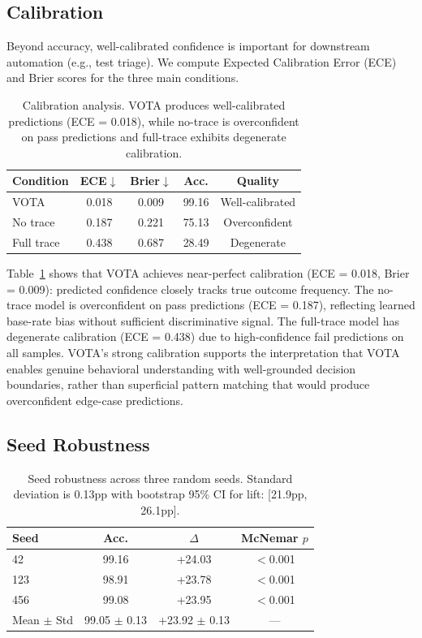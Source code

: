 \documentclass[11pt,a4paper]{article}
\begin{document}
\subsection{Calibration}

Beyond accuracy, well-calibrated confidence is important for downstream automation (e.g., test triage). We compute Expected Calibration Error (ECE) and Brier scores for the three main conditions.

\begin{table}[t]
\centering
\small
\begin{tabular}{lcccc}
\toprule
\textbf{Condition} & \textbf{ECE}$\downarrow$ & \textbf{Brier}$\downarrow$ & \textbf{Acc.} & \textbf{Quality} \\
\midrule
VOTA & 0.018 & 0.009 & 99.16 & Well-calibrated \\
No trace & 0.187 & 0.221 & 75.13 & Overconfident \\
Full trace & 0.438 & 0.687 & 28.49 & Degenerate \\
\bottomrule
\end{tabular}
\caption{Calibration analysis. VOTA produces well-calibrated predictions (ECE = 0.018), while no-trace is overconfident on pass predictions and full-trace exhibits degenerate calibration.}
\label{tab:calibration}
\end{table}

Table~\ref{tab:calibration} shows that VOTA achieves near-perfect calibration (ECE = 0.018, Brier = 0.009): predicted confidence closely tracks true outcome frequency. The no-trace model is overconfident on pass predictions (ECE = 0.187), reflecting learned base-rate bias without sufficient discriminative signal. The full-trace model has degenerate calibration (ECE = 0.438) due to high-confidence fail predictions on all samples. VOTA's strong calibration supports the interpretation that VOTA enables genuine behavioral understanding with well-grounded decision boundaries, rather than superficial pattern matching that would produce overconfident edge-case predictions.

\subsection{Seed Robustness}

\begin{table}[t]
\centering
\small
\begin{tabular}{lccc}
\toprule
\textbf{Seed} & \textbf{Acc.} & \textbf{$\Delta$} & \textbf{McNemar $p$} \\
\midrule
42 & 99.16 & +24.03 & $<$0.001 \\
123 & 98.91 & +23.78 & $<$0.001 \\
456 & 99.08 & +23.95 & $<$0.001 \\
\midrule
Mean $\pm$ Std & 99.05 $\pm$ 0.13 & +23.92 $\pm$ 0.13 & --- \\
\bottomrule
\end{tabular}
\caption{Seed robustness across three random seeds. Standard deviation is 0.13pp with bootstrap 95\% CI for lift: [21.9pp, 26.1pp].}
\label{tab:seed}
\end{table}
\end{document}
